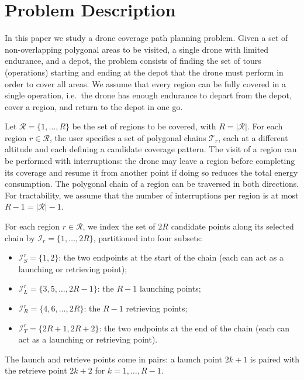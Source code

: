 \documentclass[12pt]{elsarticle}
\begin{document}
\section{Problem Description}\label{section:description}
In this paper we study a drone coverage path planning problem. Given a set of non-overlapping polygonal areas to be visited, a single drone with limited endurance, and a depot, the problem consists of finding the set of tours (operations) starting and ending at the depot that the drone must perform in order to cover all areas. We assume that every region can be fully covered in a single operation, i.e.\ the drone has enough endurance to depart from the depot, cover a region, and return to the depot in one go.

Let $\mathcal R = \{1, \ldots, R\}$ be the set of regions to be covered, with $R=|\mathcal R|$. For each region $r\in\mathcal R$, the user specifies a set of polygonal chains $\mathcal T_r$, each at a different altitude and each defining a candidate coverage pattern. The visit of a region can be performed with interruptions: the drone may leave a region before completing its coverage and resume it from another point if doing so reduces the total energy consumption. The polygonal chain of a region can be traversed in both directions. For tractability, we assume that the number of interruptions per region is at most $R-1=|\mathcal R|-1$.

For each region $r\in\mathcal R$, we index the set of $2R$ candidate points along its selected chain by $\mathcal I_r=\{1,\ldots,2R\}$, partitioned into four subsets:
   \begin{itemize}
        \item $\mathcal I_S^r=\{1, 2\}$: the two endpoints at the start of the chain (each can act as a launching or retrieving point);
        \item $\mathcal I_L^r=\{3, 5,\ldots,2R-1\}$: the $R-1$ launching points;
        \item $\mathcal I_R^r=\{4, 6,\ldots, 2R\}$: the $R-1$ retrieving points;
        \item $\mathcal I_T^r=\{2R+1, 2R+2\}$: the two endpoints at the end of the chain (each can act as a launching or retrieving point).
   \end{itemize}
    The launch and retrieve points come in pairs: a launch point $2k+1$ is paired with the retrieve point $2k+2$ for $k=1,\dots,R-1$.
\end{document}
